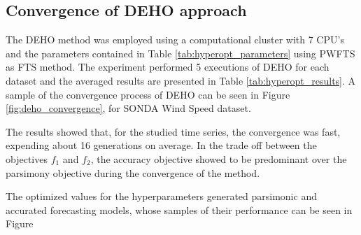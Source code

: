 \subsection{Convergence of DEHO approach}
\label{sec:scalability_convergence}

The DEHO method was employed using a computational cluster with 7 CPU's and the parameters contained in Table \ref{tab:hyperopt_parameters} using PWFTS as FTS method. The experiment performed 5 executions of DEHO for each dataset and the averaged results are presented in Table \ref{tab:hyperopt_results}. A sample of the convergence process of DEHO can be seen in Figure \ref{fig:deho_convergence}, for  SONDA Wind Speed dataset. 

The results showed that, for the studied time series, the convergence was fast, expending about 16 generations on average. In the trade off between the objectives $f_1$ and $f_2$, the accuracy objective showed to be predominant over the parsimony objective during the convergence of the method. 

The optimized values for the hyperparameters generated parsimonic and accurated forecasting models, whose samples of their performance can be seen in Figure

